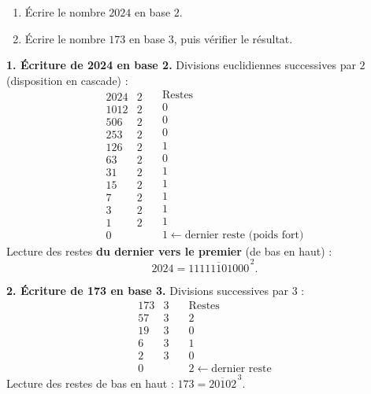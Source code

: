 \documentclass[11pt]{article}
\begin{document}
\begin{exoresolu}
\begin{enumerate}
\item Écrire le nombre $2024$ en base $2$.
\item Écrire le nombre $173$ en base $3$, puis vérifier le résultat.
\end{enumerate}
\tcblower
\textbf{1. Écriture de 2024 en base 2.} Divisions euclidiennes successives par $2$ (disposition en cascade) :
\[
\begin{array}{r|l}
2024 & 2 \\
1012 & 2 \\
506  & 2 \\
253  & 2 \\
126  & 2 \\
63   & 2 \\
31   & 2 \\
15   & 2 \\
7    & 2 \\
3    & 2 \\
1    & 2 \\
0    &
\end{array}
\quad
\begin{array}{l}
\text{Restes} \\
0 \\
0 \\
0 \\
1 \\
0 \\
1 \\
1 \\
1 \\
1 \\
1 \\
1 \leftarrow \text{dernier reste (poids fort)}
\end{array}
\]
Lecture des restes \textbf{du dernier vers le premier} (de bas en haut) :
\[ 2024 = \overline{11111101000}^{\,2}. \]

\textbf{2. Écriture de 173 en base 3.} Divisions successives par $3$ :
\[
\begin{array}{r|l}
173 & 3 \\
57  & 3 \\
19  & 3 \\
6   & 3 \\
2   & 3 \\
0   &
\end{array}
\quad
\begin{array}{l}
\text{Restes} \\
2 \\
0 \\
1 \\
0 \\
2 \leftarrow \text{dernier reste}
\end{array}
\]
Lecture des restes de bas en haut : $173 = \overline{20102}^{\,3}$.


\end{exoresolu}
\end{document}

